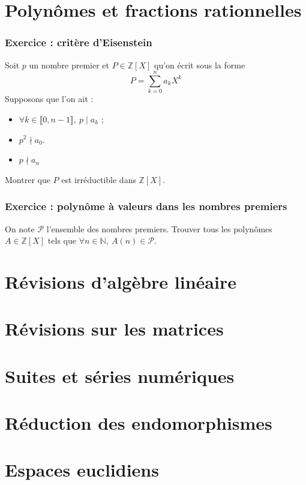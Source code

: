 \documentclass[french]{book}
\newcommand{\N}{\mathbb{N}}
\newcommand{\Z}{\mathbb{Z}}
\begin{document}
\chapter{Polynômes et fractions rationnelles}

\subsection{Exercice : critère d'Eisenstein}
Soit $p$ un nombre premier et $P\in\Z[X]$ qu'on écrit sous la forme $$P=\sum_{k=0}^{n}a_kX^k$$ Supposons que l'on ait :
\begin{itemize}
	\item $\forall k\in\llbracket0,n-1\rrbracket,\ p\mid a_k$ ;
	\item $p^2\nmid a_0$.
	\item $p\nmid a_n$
\end{itemize}
Montrer que $P$ est irréductible dans $\Z[X]$.

\subsection{Exercice : polynôme à valeurs dans les nombres premiers}
On note $\mathcal{P}$ l'ensemble des nombres premiers. Trouver tous les polynômes $A \in \Z[X]$ tels que $\forall n \in \N, \ A(n) \in \mathcal{P}$.

\chapter{Révisions d'algèbre linéaire}

\chapter{Révisions sur les matrices}

\chapter{Suites et séries numériques}

\chapter{Réduction des endomorphismes}

\chapter{Espaces euclidiens}
\end{document}
